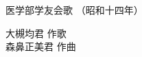 \documentclass[10pt,b5j]{tarticle} %
\begin{document}
\begin{minipage}[c]{0.7\hsize} %
    \begin{center}
        {\LARGE
            医学部学友会歌 %
        }
        {\small 
            （昭和十四年） %
        }
    \end{center}
\end{minipage}
\begin{minipage}[c]{0.3\hsize} %
    \begin{flushright} %
        大槻均君 作歌\\森鼻正美君 作曲 %
    \end{flushright}
\end{minipage}
\end{document}
